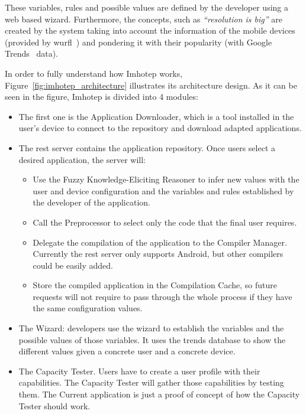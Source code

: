 These variables, rules and possible values are defined by the developer using a
web based wizard. Furthermore, the concepts, such as \textit{``resolution is 
big''}
are created by the system taking into account the information of the mobile
devices (provided by \ac{wurfl}~\citep{wurfl}) and pondering it with their popularity
(with Google Trends~\citep{trends} data).

In order to fully understand how Imhotep works, 
Figure~\ref{fig:imhotep_architecture}
illustrates its architecture design. As it can be seen in the figure, Imhotep is
divided into 4 modules:

\begin{itemize}
    \item The first one is the Application Downloader, which is a tool installed
    in the user's device to connect to the repository and download adapted
    applications.
    
    \item The \ac{rest} server contains the application repository. Once users select
    a desired application, the server will:
    
    \begin{itemize}
      \item Use the Fuzzy Knowledge-Eliciting Reasoner to infer new values with
      the user and device configuration and the variables and rules established
      by the developer of the application.
      
      \item Call the Preprocessor to select only the code that the final user
      requires.
      
      \item Delegate the compilation of the application to the Compiler Manager.
      Currently the \ac{rest} server only supports Android, but other compilers could
      be easily added.
      
      \item Store the compiled application in the Compilation Cache, so future
      requests will not require to pass through the whole process if they have
      the same configuration values.
    \end{itemize}
    
  \item The Wizard: developers use the wizard to establish the variables and the
  possible values of those variables. It uses the trends database to show the
  different values given a concrete user and a concrete device.
  
  \item The Capacity Tester. Users have to create a user profile with their
  capabilities. The Capacity Tester will gather those capabilities by testing
  them. The Current application is just a proof of concept of how the Capacity
  Tester should work.
\end{itemize}

